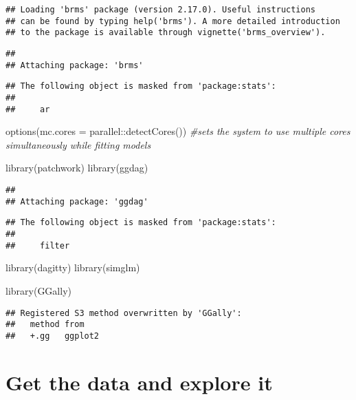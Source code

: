\documentclass[
]{article}
\newenvironment{Shaded}{\begin{snugshade}}{\end{snugshade}}
\newcommand{\AttributeTok}[1]{\textcolor[rgb]{0.77,0.63,0.00}{#1}}
\newcommand{\CommentTok}[1]{\textcolor[rgb]{0.56,0.35,0.01}{\textit{#1}}}
\newcommand{\FunctionTok}[1]{\textcolor[rgb]{0.00,0.00,0.00}{#1}}
\newcommand{\NormalTok}[1]{#1}
\newcommand{\SpecialCharTok}[1]{\textcolor[rgb]{0.00,0.00,0.00}{#1}}
\begin{document}
\begin{verbatim}
## Loading 'brms' package (version 2.17.0). Useful instructions
## can be found by typing help('brms'). A more detailed introduction
## to the package is available through vignette('brms_overview').
\end{verbatim}

\begin{verbatim}
## 
## Attaching package: 'brms'
\end{verbatim}

\begin{verbatim}
## The following object is masked from 'package:stats':
## 
##     ar
\end{verbatim}

\begin{Shaded}
\begin{Highlighting}[]
\FunctionTok{options}\NormalTok{(}\AttributeTok{mc.cores =}\NormalTok{ parallel}\SpecialCharTok{::}\FunctionTok{detectCores}\NormalTok{()) }\CommentTok{\#sets the system to use multiple cores simultaneously while fitting models}

\FunctionTok{library}\NormalTok{(patchwork)}
\FunctionTok{library}\NormalTok{(ggdag)}
\end{Highlighting}
\end{Shaded}

\begin{verbatim}
## 
## Attaching package: 'ggdag'
\end{verbatim}

\begin{verbatim}
## The following object is masked from 'package:stats':
## 
##     filter
\end{verbatim}

\begin{Shaded}
\begin{Highlighting}[]
\FunctionTok{library}\NormalTok{(dagitty)}
\FunctionTok{library}\NormalTok{(simglm)}

\FunctionTok{library}\NormalTok{(GGally)}
\end{Highlighting}
\end{Shaded}

\begin{verbatim}
## Registered S3 method overwritten by 'GGally':
##   method from   
##   +.gg   ggplot2
\end{verbatim}

\hypertarget{get-the-data-and-explore-it}{%
\section{Get the data and explore
it}\label{get-the-data-and-explore-it}}
\end{document}
